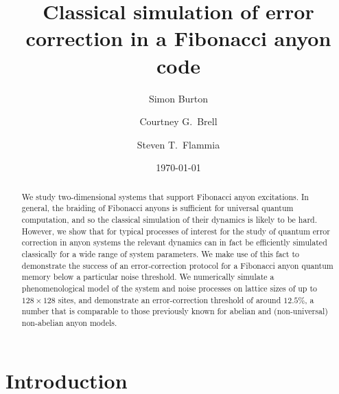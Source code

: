 \documentclass[aps, pra, a4paper, 11pt, nofootinbib, superscriptaddress, tightenlines, 
notitlepage, longbibliography]{revtex4}
\begin{document}
\title{Classical simulation of error correction in a Fibonacci anyon code}

\author{Simon Burton}
\author{Courtney G.\ Brell}
\author{Steven T.\ Flammia}

\date{\today}

\begin{abstract}
We study two-dimensional systems that support Fibonacci anyon excitations. In general, the 
braiding of Fibonacci anyons is sufficient for universal quantum computation, and so the 
classical simulation of their dynamics is likely to be hard. However, we show that for typical 
processes of interest for the study of quantum error correction in anyon systems the 
relevant dynamics can in fact be efficiently simulated classically for a wide range of system 
parameters. We make use of this fact to demonstrate the success of an error-correction 
protocol for a Fibonacci anyon quantum memory below a particular noise threshold. We 
numerically simulate a phenomenological model of the system and noise processes on lattice 
sizes of up to $128\times128$ sites, and demonstrate an error-correction threshold of around 
$12.5\%$, a number that is comparable to those previously known for abelian and 
(non-universal) non-abelian anyon models.
\end{abstract}

\maketitle



\section{Introduction}




\end{document}
